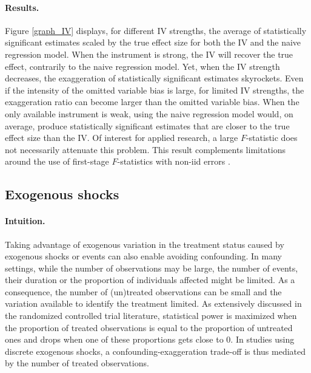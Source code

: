 \documentclass[usletter, 12pt]{article}
\begin{document}
		\paragraph{Results.} 
			Figure \ref{graph_IV} displays, for different IV strengths, the average of statistically significant estimates scaled by the true effect size for both the IV and the naive regression model. When the instrument is strong, the IV will recover the true effect, contrarily to the naive regression model. Yet, when the IV strength decreases, the exaggeration of statistically significant estimates skyrockets. Even if the intensity of the omitted variable bias is large, for limited IV strengths, the exaggeration ratio can become larger than the omitted variable bias. When the only available instrument is weak, using the naive regression model would, on average, produce statistically significant estimates that are closer to the true effect size than the IV. Of interest for applied research, a large $F$-statistic does not necessarily attenuate this problem. This result complements limitations around the use of first-stage $F$-statistics with non-iid errors \citep{youngConsistencyInferenceInstrumental2022,lalHow2024}.
		




		\subsection{Exogenous shocks}\label{sim_shocks}
    
        			\paragraph{Intuition.}  Taking advantage of exogenous variation in the treatment status caused by exogenous shocks or events can also enable avoiding confounding. In many settings, while the number of observations may be large, the number of events, their duration or the proportion of individuals affected might be limited. As a consequence, the number of (un)treated observations can be small and the variation available to identify the treatment limited. As extensively discussed in the randomized controlled trial literature, statistical power is maximized when the proportion of treated observations is equal to the proportion of untreated ones and drops when one of these proportions gets close to 0. In studies using discrete exogenous shocks, a confounding-exaggeration trade-off is thus mediated by the number of treated observations. %
			
\end{document}
